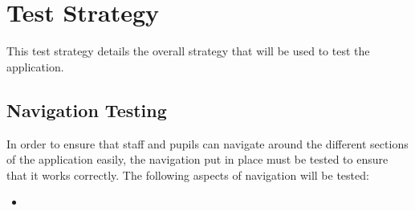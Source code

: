 \section{Test Strategy}
This test strategy details the overall strategy that will be used to test the application.

\subsection{Navigation Testing}
In order to ensure that staff and pupils can navigate around the different sections of the application easily, the navigation put in place must be tested to ensure that it works correctly. The following aspects of navigation will be tested:

\begin{itemize}
\item 
\end{itemize}
